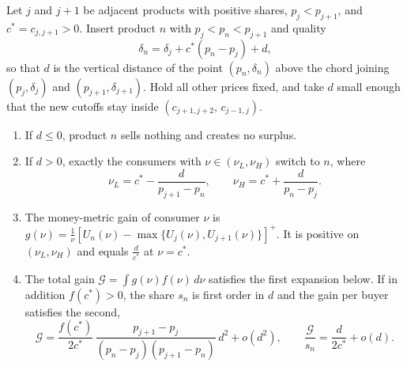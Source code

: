 \begin{proposition}\label{prop:10-vertical-gain}
Let $j$ and $j+1$ be adjacent products with positive shares, $p_j < p_{j+1}$, and $c^* = c_{j,j+1} > 0$. Insert
product $n$ with $p_j < p_n < p_{j+1}$ and quality
\begin{equation}\label{eq:10-vertical-d}
\delta_n = \delta_j + c^*(p_n - p_j) + d ,
\end{equation}
so that $d$ is the vertical distance of the point $(p_n,\delta_n)$ above the chord joining $(p_j,\delta_j)$ and
$(p_{j+1},\delta_{j+1})$. Hold all other prices fixed, and take $d$ small enough that the new cutoffs stay inside
$(c_{j+1,j+2},\,c_{j-1,j})$.
\begin{enumerate}[label=(\alph*)]
\item If $d\le 0$, product $n$ sells nothing and creates no surplus.
\item If $d > 0$, exactly the consumers with $\nu\in(\nu_L,\nu_H)$ switch to $n$, where
\begin{equation*}
\nu_L = c^* - \frac{d}{p_{j+1} - p_n},
\qquad
\nu_H = c^* + \frac{d}{p_n - p_j}.
\end{equation*}
\item The money-metric gain of consumer $\nu$ is $g(\nu) = \frac{1}{\nu}\left[U_n(\nu) - \max\{U_j(\nu),
U_{j+1}(\nu)\}\right]^+$. It is positive on $(\nu_L,\nu_H)$ and equals $\frac{d}{c^*}$ at $\nu = c^*$.
\item The total gain $\mathcal{G} = \int g(\nu)f(\nu)\,d\nu$ satisfies the first expansion below. If in addition
$f(c^*) > 0$, the share $s_n$ is first order in $d$ and the gain per buyer satisfies the second,
\begin{equation}\label{eq:10-vertical-gain}
\mathcal{G} = \frac{f(c^*)}{2c^*}\,\frac{p_{j+1} - p_j}{(p_n - p_j)(p_{j+1} - p_n)}\,d^2 + o(d^2),
\qquad
\frac{\mathcal{G}}{s_n} = \frac{d}{2c^*} + o(d).
\end{equation}
\end{enumerate}
\end{proposition}

